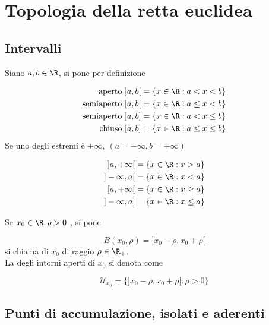 \documentclass[../analisi.tex]{subfiles}
\begin{document}
\section{Topologia della retta euclidea}

\subsection{Intervalli}
Siano $a,b \in \R$, si pone per definizione 


\begin{equation}
	\begin{aligned}
	\mbox{aperto}    \ ] a,b [ &= \{ x \in \R : a < x < b \}\\
	\mbox{semiaperto}\ [ a,b [ &= \{ x \in \R : a \leq x < b\}\\
	\mbox{semiaperto}\ ] a,b ] &= \{ x \in \R : a < x \leq b\}\\
	\mbox{chiuso}    \ [ a,b ] &= \{ x \in \R : a \leq x \leq b\}
	\end{aligned} %
\end{equation}
Se uno degli estremi è $\pm \infty,\ (a = - \infty, b = + \infty)$


\begin{equation}
	\begin{aligned}
		] a, +\infty [ &= \{ x \in \R: x > a \}\\
		] -\infty, a [ &= \{ x \in \R: x < a \}\\
		[ a, +\infty [ &= \{ x \in \R: x \geq a \}\\
		] -\infty, a ] &= \{ x \in \R: x \leq a \}\\
	\end{aligned}
\end{equation}

\begin{defn}
Se $ x_0 \in \R, \rho > 0$ , si pone 


\begin{equation}
	B( x_0, \rho) = ] x_0 - \rho, x_0 + \rho [
\end{equation}
si chiama  di $x_0$ di raggio $\rho \in \R_+$.\\
La  degli intorni aperti di $x_0$ si denota come


\begin{equation}
	\mathcal{U}_{x_0} = \{ ] x_0 - \rho, x_0 + \rho [ : \rho > 0 \}
\end{equation}
\end{defn}

\subsection{Punti di accumulazione, isolati e aderenti}
\end{document}
